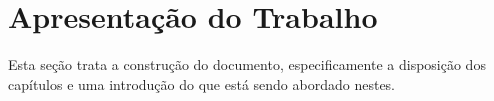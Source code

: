 

\section{Apresentação do Trabalho}
    \label{sec:apresentacao-trabalho}
    
    Esta seção trata a construção do documento, especificamente a disposição dos capítulos e uma introdução do que está sendo abordado nestes.
    